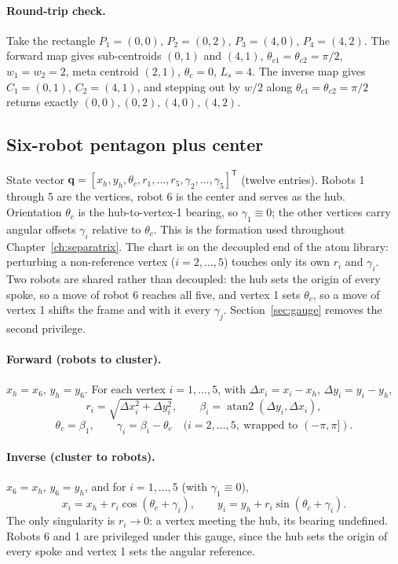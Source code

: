 \documentclass[12pt, letterpaper, oneside]{report}
\begin{document}
\paragraph{Round-trip check.} Take the rectangle $P_1=(0,0)$, $P_2=(0,2)$,
$P_3=(4,0)$, $P_4=(4,2)$. The forward map gives sub-centroids $(0,1)$ and
$(4,1)$, $\theta_{c1}=\theta_{c2}=\pi/2$, $w_1=w_2=2$, meta centroid
$(2,1)$, $\theta_c=0$, $L_s=4$. The inverse map gives $C_1=(0,1)$,
$C_2=(4,1)$, and stepping out by $w/2$ along
$\theta_{c1}=\theta_{c2}=\pi/2$ returns exactly $(0,0),(0,2),(4,0),(4,2)$.

\subsection{Six-robot pentagon plus center}
\label{sec:atom_pentagon}

State vector
$\mathbf{q}=[x_h,y_h,\theta_c,r_1,\ldots,r_5,\gamma_2,\ldots,\gamma_5]^{\mathsf T}$
(twelve entries). Robots 1 through 5 are the vertices, robot 6 is the
center and serves as the hub. Orientation $\theta_c$ is the hub-to-vertex-1
bearing, so $\gamma_1\equiv0$; the other vertices carry angular offsets
$\gamma_i$ relative to $\theta_c$. This is the formation used throughout
Chapter~\ref{ch:separatrix}. The chart is on the decoupled end of the atom
library: perturbing a non-reference vertex ($i=2,\ldots,5$) touches only its
own $r_i$ and $\gamma_i$. Two robots are shared rather than decoupled: the
hub sets the origin of every spoke, so a move of robot 6 reaches all five,
and vertex 1 sets $\theta_c$, so a move of vertex 1 shifts the frame and
with it every $\gamma_j$. Section~\ref{sec:gauge} removes the second
privilege.

\paragraph{Forward (robots to cluster).}
$x_h=x_6$, $y_h=y_6$. For each vertex $i=1,\ldots,5$, with
$\Delta x_i = x_i - x_h$, $\Delta y_i = y_i - y_h$,
\begin{equation}
r_i = \sqrt{\Delta x_i^2 + \Delta y_i^2}, \qquad \beta_i = \operatorname{atan2}(\Delta y_i, \Delta x_i),
\end{equation}
\begin{equation}
\theta_c = \beta_1, \qquad \gamma_i = \beta_i - \theta_c \quad (i=2,\ldots,5,\ \text{wrapped to } (-\pi,\pi]).
\end{equation}

\paragraph{Inverse (cluster to robots).}
$x_6=x_h$, $y_6=y_h$, and for $i=1,\ldots,5$ (with $\gamma_1\equiv0$),
\begin{equation}
x_i = x_h + r_i\cos(\theta_c+\gamma_i), \qquad y_i = y_h + r_i\sin(\theta_c+\gamma_i).
\end{equation}
The only singularity is $r_i\to0$: a vertex meeting the hub, its bearing
undefined. Robots 6 and 1 are privileged under this gauge, since the hub
sets the origin of every spoke and vertex 1 sets the angular reference.
\end{document}
